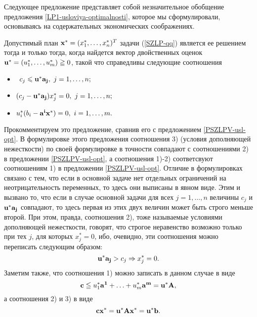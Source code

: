     Следующее предложение представляет собой незначительное обобщение предложения
    \ref{LP1-usloviya-optimalnosti}, которое мы сформулировали, основываясь на содержательных
    экономических соображениях.

\begin{prop}
    \label{SZLP-1-usl-opt}
    Допустимый план $\mathbf{x^{*}}=(x_{1}^{*},\ldots,x_{n}^{*})^{T}$ задачи
    (\ref{SZLP-qq}) является ее решением тогда и только тогда, когда
    найдется вектор двойственных  оценок
    $\mathbf{u}^{*}=(u_{1}^{*},\ldots,u_{m}^{*})\geqq0$,  такой что
    справедливы следующие соотношения
\begin{itemize}
\item [1)\ ] \
    $c_{j}\leqslant\vc{u}^{*}\vc{a_{j}}, \ j=1,\ldots,n;$
\item [2)\ ]
    $(c_{j}-\vc{u}^{*}\vc{a_{j}})x_{j}^{*}=0, \ j=1,\ldots,n;$
\item [3)\ ]
    $u_{i}^{*}(b_{i}-\vc{a^{i}}\vc{x}^{*})=0, \ i=1,\ldots,m.$
\end{itemize}
\end{prop}

    Прокомментируем это предложение, сравнив его с предложением
    \ref{PSZLPV-usl-opt}. В формулировке этого предложения
    соотношения 3) (условия дополняющей нежесткости) по
    своей формулировке в точности совпадают с соотношениями 2) в
    предложении \ref{PSZLPV-usl-opt}, а соотношения 1)-2)
    соответсвуют соотношениям 1) в предложении \ref{PSZLPV-usl-opt}.
    Отличие в формулировках связано с тем, что если в
    основной задаче нет отдельных ограничений на неотрицательность
    переменных, то здесь они выписаны в явном виде. Этим и вызвано
    то, что если в случае основной задачи для всех $j=1,\ldots,n$
    величины $c_{j}$  и $\mathbf{u}^{*}\mathbf{a_{j}}$ совпадают, то здесь
    первая из этих двух величин может быть строго меньше второй. При этом, правда,
    соотношения 2), тоже называемые условиями дополняющей
    нежесткости, говорят, что строгое неравенство возможно только при тех
    $j$, для которых $x_{j}^{*}=0$, ибо, очевидно, эти соотношения можно
    переписать следующим образом:
\[
    \mathbf{u}^{*}\mathbf{a_{j}}>c_{j}\Rightarrow x_{j}^{*}=0.
\]
    Заметим также, что соотношения 1) можно записать в данном случае в
    виде
    \[\mathbf{c}\leqq u_{1}^{*}\mathbf{a^{1}}+\ldots+u_{m}^{*}\mathbf{a^{m}}=\mathbf{u}^{*}\mathbf{A},\]
    а соотношения 2) и 3) в виде
    \[\mathbf{c}\mathbf{x}^{*}=\mathbf{u}^{*}\mathbf{A}\mathbf{x}^{*}=\mathbf{u}^{*}\mathbf{b}.\]

